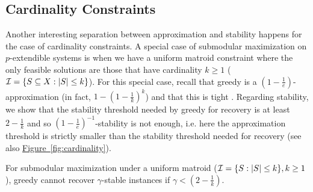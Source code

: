 \subsection{Cardinality Constraints}\label{sec:cardinality-counter}

Another interesting separation between approximation and stability happens for the case of cardinality constraints. A special case of submodular maximization on $p$-extendible systems is when we have a uniform matroid constraint where the only feasible solutions are those that have cardinality $k \ge 1$ ($\mathcal{I}=\{S\subseteq X: |S|\le k\}$). For this special case, recall that greedy is a $(1-\tfrac{1}{e})$-approximation (in fact, $1-(1-\tfrac{1}{k})^k$) and that this is tight \cite{feige1998threshold}. Regarding stability, we show that the stability threshold needed by greedy for recovery is at least $2-\tfrac{1}{k}$ and so $(1-\tfrac{1}{e})^{-1}$-stability is not enough, i.e. here the approximation threshold is strictly smaller than the stability threshold needed for recovery (see also \hyperref[fig:cardinality]{Figure~\ref{fig:cardinality}}).

\begin{proposition}
For submodular maximization under a uniform matroid ($\mathcal{I}=\{S: |S|\le k\},k\ge 1$), greedy cannot recover $\gamma$-stable instances if $\gamma<(2-\tfrac{1}{k})$.
\end{proposition}

